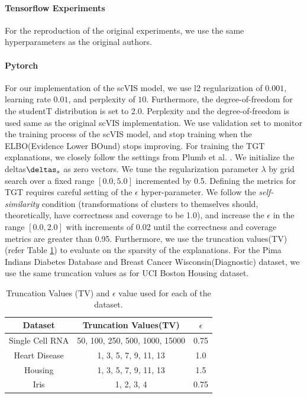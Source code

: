 \paragraph{Tensorflow \cite{abadi2016tensorflow} Experiments}
For the reproduction of the original experiments, we use the same hyperparameters as the original authors.

\paragraph{Pytorch}
For our implementation of the scVIS model, we use l2 regularization of $0.001$, learning rate $0.01$, and perplexity of $10$. Furthermore, the degree-of-freedom for the studentT distribution is set to 2.0. Perplexity and the degree-of-freedom is used same as the original scVIS implementation. We use validation set to monitor the training process of the scVIS model, and stop training when the ELBO(Evidence Lower BOund)\cite{kingma2014autoencoding} stops improving. For training the TGT explanations, we closely follow the settings from Plumb et al. \cite{plumb2020explaining}. We initialize the deltas$\deltas_{s}$ as zero vectors. We tune the regularization parameter $\lambda$ by grid search over a fixed range $[0.0, 5.0]$ incremented by 0.5. Defining the metrics for TGT requires careful setting of the $\epsilon$ hyper-parameter.  We follow the \textit{self-similarity} condition (transformations of clusters to themselves should, theoretically, have correctness and coverage to be 1.0), and increase the $\epsilon$ in the range $[0.0, 2.0]$ with increments of 0.02 until the correctness and coverage metrics are greater than 0.95.  Furthermore, we use the truncation values(TV)(refer Table \ref{tab:tv}) to evaluate on the sparsity of the explanations. For the Pima Indians Diabetes Database and Breast Cancer Wisconsin(Diagnostic) dataset, we use the same truncation values as for UCI Boston Housing dataset.

\begin{table}[!ht]
    \centering
    \begin{tabular}{|c|c|c|}
    \hline
     \bf Dataset & \bf{Truncation Values(TV)} & \bf{$\epsilon$} \\
     \hline
        Single Cell RNA & 50, 100, 250, 500, 1000, 15000 & 0.75 \\
        \hline
        Heart Disease & 1, 3, 5, 7, 9, 11, 13 & 1.0 \\
        \hline
        Housing & 1, 3, 5, 7, 9, 11, 13 & 1.5 \\
        \hline
        Iris & 1, 2, 3, 4 & 0.75 \\
        \hline
    \end{tabular}
    \caption{Truncation Values (TV) and $\epsilon$ value used for each of the dataset.}
    \label{tab:tv}
\end{table}



